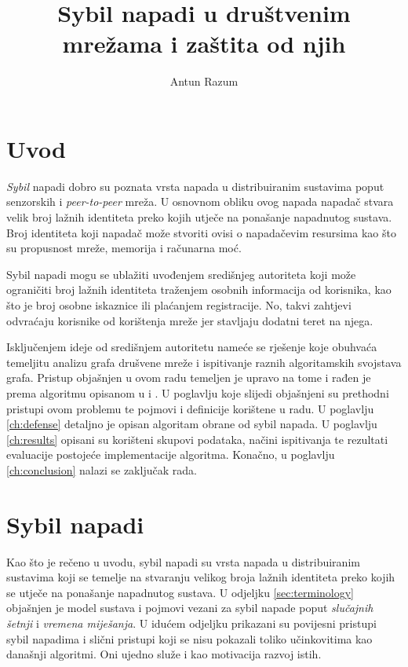 \documentclass[times, utf8, seminar, numeric]{fer}
\begin{document}
\title{Sybil napadi u društvenim mrežama i zaštita od njih}
\author{Antun Razum}

\maketitle

\tableofcontents

\chapter{Uvod}
\textit{Sybil} napadi  dobro su poznata vrsta napada u distribuiranim sustavima poput senzorskih i \textit{peer-to-peer} mreža. U osnovnom obliku ovog napada napadač stvara velik broj lažnih identiteta preko kojih utječe na ponašanje napadnutog sustava. Broj identiteta koji napadač može stvoriti ovisi o napadačevim resursima kao što su propusnost mreže, memorija i računarna moć.

Sybil napadi mogu se ublažiti uvođenjem središnjeg autoriteta koji može ograničiti broj lažnih identiteta traženjem osobnih informacija od korisnika, kao što je broj osobne iskaznice ili plaćanjem registracije. No, takvi zahtjevi odvraćaju korisnike od korištenja mreže jer stavljaju dodatni teret na njega.

Isključenjem ideje od središnjem autoritetu nameće se rješenje koje obuhvaća temeljitu analizu grafa drušvene mreže i ispitivanje raznih algoritamskih svojstava grafa. Pristup objašnjen u ovom radu temeljen je upravo na tome i rađen je prema algoritmu opisanom u \cite{sybil-defender-old} i \cite{sybil-defender}. U poglavlju koje slijedi objašnjeni su prethodni pristupi ovom problemu te pojmovi i definicije korištene u radu. U poglavlju \ref{ch:defense} detaljno je opisan algoritam obrane od sybil napada. U poglavlju \ref{ch:results} opisani su korišteni skupovi podataka, načini ispitivanja te rezultati evaluacije postojeće implementacije algoritma. Konačno, u poglavlju \ref{ch:conclusion} nalazi se zaključak rada.

\chapter{Sybil napadi} \label{ch:sybil}
Kao što je rečeno u uvodu, sybil napadi su vrsta napada u distribuiranim sustavima koji se temelje na stvaranju velikog broja lažnih identiteta preko kojih se utječe na ponašanje napadnutog sustava. U odjeljku \ref{sec:terminology} objašnjen je model sustava i pojmovi vezani za sybil napade poput \textit{slučajnih šetnji} i \textit{vremena miješanja}. U idućem odjeljku prikazani su povijesni pristupi sybil napadima i slični pristupi koji se nisu pokazali toliko učinkovitima kao današnji algoritmi. Oni ujedno služe i kao motivacija razvoj istih.
\end{document}
